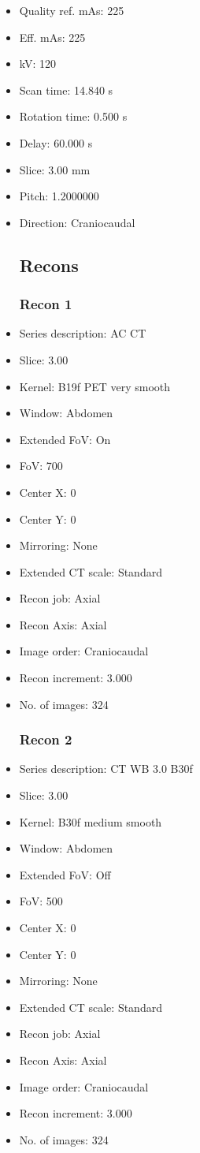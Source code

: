 \documentclass[12pt]{article}
\begin{document}
\begin{itemize}
\subsection{Scan}
\item Quality ref. mAs: 225\item Eff. mAs: 225\item kV: 120\item Scan time: 14.840 s\item Rotation time: 0.500 s\item Delay: 60.000 s\item Slice: 3.00 mm\item Pitch: 1.2000000\item Direction: Craniocaudal\subsection{Recons}

\subsubsection{Recon 1}
\item Series description: AC CT
\item Slice: 3.00
\item Kernel: B19f PET very smooth
\item Window: Abdomen
\item Extended FoV: On
\item FoV: 700
\item Center X: 0
\item Center Y: 0
\item Mirroring: None
\item Extended CT scale: Standard
\item Recon job: Axial
\item Recon Axis: Axial
\item Image order: Craniocaudal
\item Recon increment: 3.000
\item No. of images: 324
\subsubsection{Recon 2}
\item Series description: CT WB 3.0 B30f
\item Slice: 3.00
\item Kernel: B30f medium smooth
\item Window: Abdomen
\item Extended FoV: Off
\item FoV: 500
\item Center X: 0
\item Center Y: 0
\item Mirroring: None
\item Extended CT scale: Standard
\item Recon job: Axial
\item Recon Axis: Axial
\item Image order: Craniocaudal
\item Recon increment: 3.000
\item No. of images: 324

\end{itemize}
\end{document}
